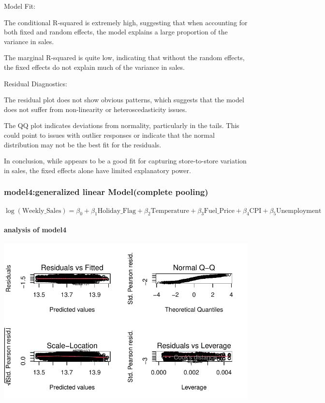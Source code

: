 \documentclass[
  letterpaper,
  DIV=11,
  numbers=noendperiod]{scrartcl}
\let\oldparagraph\paragraph
\renewcommand{\paragraph}[1]{\oldparagraph{#1}\mbox{}}
\begin{document}
Model Fit:

The conditional R-squared is extremely high, suggesting that when
accounting for both fixed and random effects, the model explains a large
proportion of the variance in sales.

The marginal R-squared is quite low, indicating that without the random
effects, the fixed effects do not explain much of the variance in sales.

Residual Diagnostics:

The residual plot does not show obvious patterns, which suggests that
the model does not suffer from non-linearity or heteroscedasticity
issues.

The QQ plot indicates deviations from normality, particularly in the
tails. This could point to issues with outlier responses or indicate
that the normal distribution may not be the best fit for the residuals.

In conclusion, while appears to be a good fit for capturing
store-to-store variation in sales, the fixed effects alone have limited
explanatory power.

\hypertarget{model4generalized-linear-modelcomplete-pooling}{%
\subsubsection{model4:generalized linear Model(complete
pooling)}\label{model4generalized-linear-modelcomplete-pooling}}

\(\log(\text{Weekly_Sales}) = \beta_0 + \beta_1 \text{Holiday_Flag} + \beta_2 \text{Temperature} + \beta_3 \text{Fuel_Price} + \beta_4 \text{CPI} + \beta_5 \text{Unemployment}\)

\hypertarget{analysis-of-model4}{%
\paragraph{analysis of model4}\label{analysis-of-model4}}

\includegraphics{678final_files/figure-pdf/unnamed-chunk-11-1.pdf}
\end{document}
